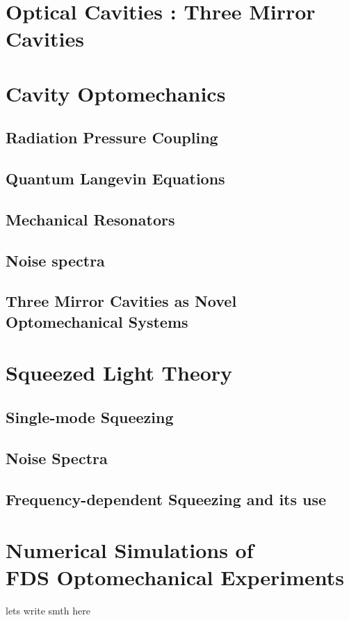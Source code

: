 \section{\texorpdfstring{\color{red}Optical Cavities : Three Mirror Cavities}{Optical Cavities : Three Mirror Cavities}}
\subsection{}
\hspace{1pt}

\section{Cavity Optomechanics}
\subsection{Radiation Pressure Coupling}
\subsection{Quantum Langevin Equations}
\subsection{\texorpdfstring{Mechanical Resonators}{Mechanical Resonators}}
\subsection{Noise spectra}
\subsection{\texorpdfstring{\color{red} Three Mirror Cavities as Novel Optomechanical Systems}{Three Mirror Cavities as Novel Optomechanical Systems}}
\hspace{1pt}

\section{Squeezed Light Theory}
\subsection{Single-mode Squeezing}
\subsection{Noise Spectra }
\subsection{Frequency-dependent Squeezing and its use}
\hspace{1pt}

\section{\texorpdfstring{Numerical Simulations of \\ FDS Optomechanical Experiments}{Numerical Simulations of FDS Optomechanical Experiments}}

lets write smth here 
